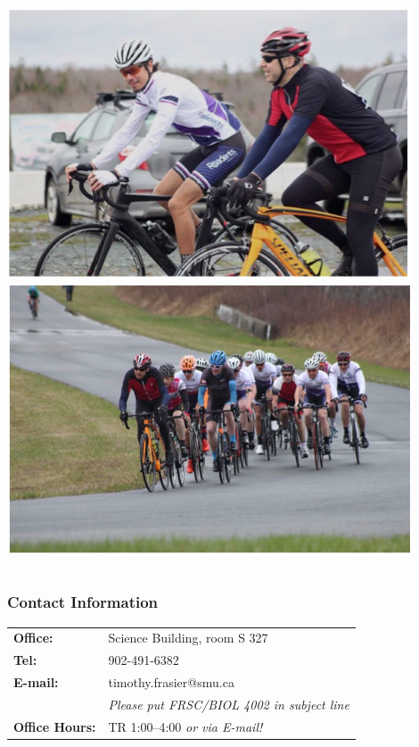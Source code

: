 \documentclass[10pt]{beamer}
\begin{document}
\begin{frame}
\begin{columns}
		\begin{column}{0.4\textwidth}
			\includegraphics[width=0.9\textwidth]{figures/cycling1.png}\\
			\vspace{0.5cm}
			\includegraphics[width=0.9\textwidth]{figures/cycling2.png}\\
		\end{column}
	\end{columns}
\end{frame}


\begin{frame}[t]
\frametitle{Contact Information}
\vspace{0.5cm}

	\begin{tabular}{@{} l l}
		\textbf{Office:} & Science Building, room S 327\\
		\addlinespace
		\addlinespace
		\textbf{Tel:} & 902-491-6382\\
		\addlinespace
		\addlinespace
		\textbf{E-mail:} & timothy.frasier@smu.ca\\
				& \textcolor{myblue2}{\emph{Please put FRSC/BIOL 4002 in subject line}}\\
		\addlinespace
		\addlinespace
		\textbf{Office Hours:} & TR 1:00--4:00 \textcolor{myblue2}{\emph{or via E-mail!}}\\
	\end{tabular}
\end{frame}
\end{document}
